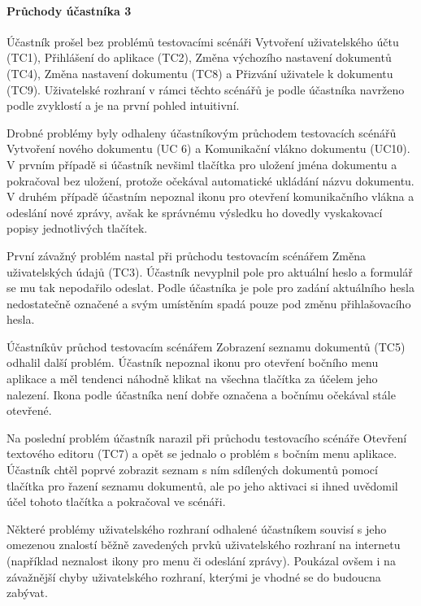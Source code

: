 \paragraph{Průchody účastníka 3}

Účastník prošel bez problémů testovacími scénáři Vytvoření uživatelského účtu (TC1), Přihlášení do aplikace (TC2), Změna výchozího nastavení dokumentů (TC4), Změna nastavení dokumentu (TC8) a Přizvání uživatele k dokumentu (TC9).
Uživatelské rozhraní v rámci těchto scénářů je podle účastníka navrženo podle zvyklostí a je na první pohled intuitivní.

Drobné problémy byly odhaleny účastníkovým průchodem testovacích scénářů Vytvoření nového dokumentu (UC 6) a Komunikační vlákno dokumentu (UC10).
V prvním případě si účastník nevšiml tlačítka pro uložení jména dokumentu a pokračoval bez uložení, protože očekával automatické ukládání názvu dokumentu.
V druhém případě účastním nepoznal ikonu pro otevření komunikačního vlákna a odeslání nové zprávy, avšak ke správnému výsledku ho dovedly vyskakovací popisy jednotlivých tlačítek.

První závažný problém nastal při průchodu testovacím scénářem Změna uživatelských údajů (TC3).
Účastník nevyplnil pole pro aktuální heslo a formulář se mu tak nepodařilo odeslat.
Podle účastníka je pole pro zadání aktuálního hesla nedostatečně označené a svým umístěním spadá pouze pod změnu přihlašovacího hesla.

Účastníkův průchod testovacím scénářem Zobrazení seznamu dokumentů (TC5) odhalil další problém.
Účastník nepoznal ikonu pro otevření bočního menu aplikace a měl tendenci náhodně klikat na všechna tlačítka za účelem jeho nalezení.
Ikona podle účastníka není dobře označena a bočnímu očekával stále otevřené.

Na poslední problém účastník narazil při průchodu testovacího scénáře Otevření textového editoru (TC7) a opět se jednalo o problém s bočním menu aplikace.
Účastník chtěl poprvé zobrazit seznam s ním sdílených dokumentů pomocí tlačítka pro řazení seznamu dokumentů, ale po jeho aktivaci si ihned uvědomil účel tohoto tlačítka a pokračoval ve scénáři.

Některé problémy uživatelského rozhraní odhalené účastníkem souvisí s jeho omezenou znalostí běžně zavedených prvků uživatelského rozhraní na internetu (například neznalost ikony pro menu či odeslání zprávy).
Poukázal ovšem i na závažnější chyby uživatelského rozhraní, kterými je vhodné se do budoucna zabývat.

